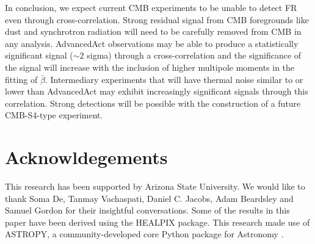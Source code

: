 \documentclass[usenatbib,hidelinks]{mnras}
\begin{document}
{ In conclusion, we expect current
CMB experiments to be unable to detect FR even through cross-correlation. 
Strong residual signal from CMB foregrounds like dust and synchrotron radiation will need to be carefully removed from CMB in any analysis.
 AdvancedAct observations may be able to produce a statistically significant signal ($\sim 2$ sigma) through a cross-correlation and the significance of the signal will increase with the inclusion of higher multipole moments in the fitting of $\bar{\beta}$. 
Intermediary experiments that will have thermal noise similar to or lower than AdvancedAct may exhibit increasingly significant signals through this correlation. 
Strong detections will be possible with the construction of a future CMB-S4-type experiment.

}

\section{Acknowldegements}{
This research has been supported by Arizona State University.
We would like to thank Soma De, Tanmay Vachaspati, Daniel C. Jacobs,  Adam Beardsley and Samuel Gordon for their insightful conversations.
 Some of the results in this paper have been derived using the {\footnotesize HEALPIX} \citep{gorski_et_al2005} package.
 This research made use of {\footnotesize ASTROPY}, a community-developed core Python package for Astronomy \citep{astropy_2013}.

}



\end{document}
